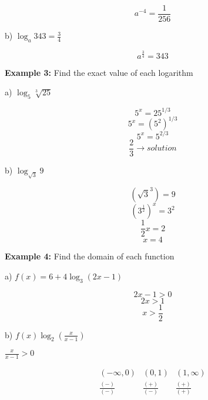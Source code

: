 \documentclass{report}
\begin{document}

$$a^{-4} = \frac{1}{256}$$
\bigbreak \noindent
\begin{large}
  b) $\log _a 343=\frac{3}{4}$
\end{large}


$$a^{\frac{3}{4}}=343$$

\bigbreak \noindent \bigbreak \noindent
\begin{large}
	\textbf{Example 3:}
	Find the exact value of each logarithm
\end{large}
\bigbreak \noindent
\begin{large}
  a) $\log _5 \sqrt[3]{25}$
\end{large}


$$
5^x=25^{1 / 3}
$$
$$
5^x=\left(5^2\right)^{1 / 3}
$$
$$
5^x=5^{2 / 3}
$$
$$ \frac{2}{3} \rightarrow solution$$
\bigbreak \noindent
\begin{large}
b) $\log _{\sqrt{3}} 9$
\end{large}


$$(\sqrt{3}^3)=9$$
$$(3^{\frac{1}{2}})^{x}=3^2$$
$$\frac{1}{2}x = 2$$
$$x=4$$
\bigbreak \noindent \bigbreak \noindent
\begin{large}
	\textbf{Example 4:}
	Find the domain of each function 
\end{large}
\bigbreak \noindent
\begin{large}
  a) $f(x)=6+4 \log _3(2 x-1)$
\end{large}


$$2x-1 > 0$$
$$2x>1$$
$$x>\frac{1}{2}$$

\bigbreak \noindent \bigbreak \noindent
\begin{large}
  b) $f(x)\log _2\left(\frac{x}{x-1}\right)$
\end{large}


\noindent $\frac{x}{x-1}>0$
\begin{center}
\end{center}
$$
\begin{array}{ccc}
(-\infty, 0) & (0,1) & (1, \infty) \\
\frac{(-)}{(-)} & \frac{(+)}{(-)} & \frac{(+)}{(+)}
\end{array}
$$ 
\vspace{5mm}
\end{document}
